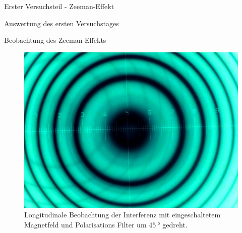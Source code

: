 \documentclass[pdftex, a4paper,11pt, twoside, ngerman]{report}
\begin{document}
\begin{chapter}{Erster Versuchsteil - Zeeman-Effekt}
\begin{section}{Auswertung des ersten Versuchstages}
\begin{subsection}{Beobachtung des Zeeman-Effekts}
\begin{figure}[b!]
\begin{minipage}{0.48\textwidth}
            \includegraphics[width=\textwidth]
                {Figures/parallel5inv.png}
            \caption{Longitudinale Beobachtung der Interferenz mit 
                eingeschaltetem Magnetfeld und Polarisations Filter um 
                $\SI{45}{\degree}$ gedreht.}
            \label{fig:para5inv}
          \end{minipage}
        \end{figure}
        
      \end{subsection}
      
      
      

\end{section}
\end{chapter}
\end{document}
